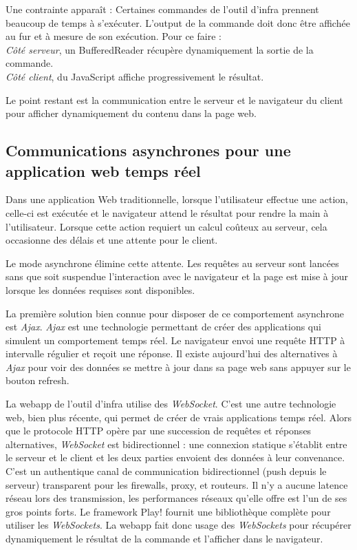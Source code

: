 Une contrainte apparaît :
Certaines commandes de l'outil d'infra prennent beaucoup de temps à s'exécuter.
L'output de la commande doit donc être affichée au fur et à mesure de son
exécution. Pour ce faire :\\
\textit{Côté serveur}, un BufferedReader récupère dynamiquement la sortie de la commande.\\
\textit{Côté client}, du JavaScript affiche progressivement le résultat.

Le point restant est la communication entre le serveur et le navigateur du
client pour afficher dynamiquement du contenu dans la page web.

\subsection{Communications asynchrones pour une application web temps réel}

Dans une application Web traditionnelle, lorsque l'utilisateur effectue une
action, celle-ci est exécutée et le navigateur attend le résultat pour rendre
la main à l'utilisateur. Lorsque cette action requiert un calcul coûteux
au serveur, cela occasionne des délais et une attente pour le client.

Le mode asynchrone élimine cette attente. Les requêtes au serveur sont lancées
sans que soit suspendue l'interaction avec le navigateur et la page est mise à
jour lorsque les données requises sont disponibles.

La première solution bien connue pour disposer de ce comportement asynchrone est
\textit{Ajax}.
\textit{Ajax} est une technologie permettant de créer des applications qui simulent un
comportement temps réel. Le navigateur envoi une requête HTTP à intervalle
régulier et reçoit une réponse.
Il existe aujourd'hui des alternatives à \textit{Ajax} pour voir des données se
mettre à jour dans sa page web sans appuyer sur le bouton refresh.

La webapp de l'outil d'infra utilise des \textit{WebSocket}.
C'est une autre technologie web, bien plus récente, qui permet de créer de vrais
applications temps réel.
Alors que le protocole HTTP opère par une succession de requêtes et réponses
alternatives, \textit{WebSocket} est bidirectionnel : une connexion statique s'établit
entre le serveur et le client et les deux parties envoient des données à leur
convenance.
C'est un authentique canal de communication bidirectionnel (push depuis le
serveur) transparent pour les firewalls, proxy, et routeurs.
Il n'y a aucune latence réseau lors des transmission, les performances réseaux
qu'elle offre est l'un de ses gros points forts.
Le framework Play! fournit une bibliothèque complète pour utiliser les
\textit{WebSockets}.
La webapp fait donc usage des \textit{WebSockets} pour récupérer dynamiquement le
résultat de la commande et l'afficher dans le navigateur.

